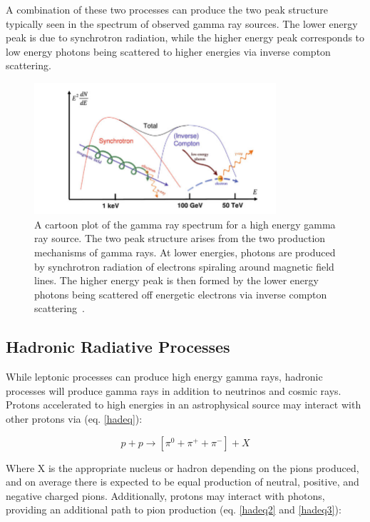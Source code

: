 A combination of these two processes can produce the two peak structure typically seen in the spectrum of observed gamma ray sources. The lower energy peak is due to synchrotron radiation, while the higher energy peak corresponds to low energy photons being scattered to higher energies via inverse compton scattering. 
    
\begin{figure}[h]
\centering
\includegraphics[width=0.8\textwidth]{figs/toygammaspect.png}
\caption{A cartoon plot of the gamma ray spectrum for a high energy gamma ray source. The two peak structure arises from the two production mechanisms of gamma rays. At lower energies, photons are produced by synchrotron radiation of electrons spiraling around magnetic field lines. The higher energy peak is then formed by the lower energy photons being scattered off energetic electrons via inverse compton scattering~\cite{pimenta_partphys_compton}. }
\label{fig:fermifig}
\end{figure}

\subsection{Hadronic Radiative Processes}
While leptonic processes can produce high energy gamma rays, hadronic processes will produce gamma rays in addition to neutrinos and cosmic rays. Protons accelerated to high energies in an astrophysical source may interact with other protons via (eq. \ref{hadeq}):

\begin{equation}
    p + p \rightarrow [\pi^0 + \pi^+ + \pi^-] + X
\label{hadeq}    
\end{equation}

Where X is the appropriate nucleus or hadron depending on the pions produced, and on average there is expected to be equal production of neutral, positive, and negative charged pions. Additionally, protons may interact with photons, providing an additional path to pion production (eq. \ref{hadeq2} and \ref{hadeq3}):

